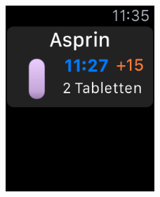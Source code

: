 \begin{figure}
	\includegraphics[width=0.5\textwidth]{04_realisation/screenshots/watch/delay04.png}
\end{figure}


